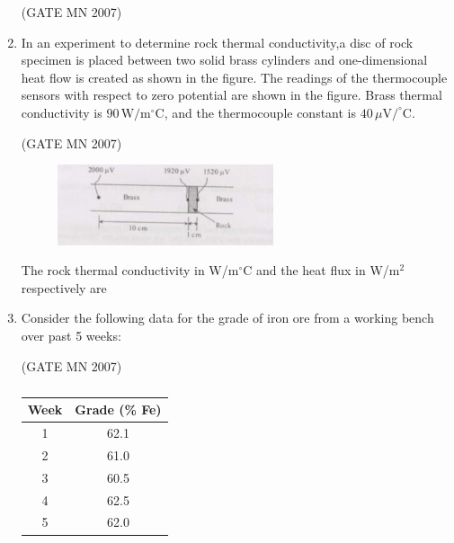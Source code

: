 \documentclass[journal]{IEEEtran}
\begin{document}
\begin{enumerate}
\hfill (GATE MN 2007)
\begin{enumerate}
\end{enumerate}


\item In an experiment to determine rock thermal conductivity,a disc of rock specimen is placed between two solid brass cylinders and one-dimensional heat flow is created as shown in the figure.  
The readings of the thermocouple sensors with respect to zero potential are shown in the figure.  
Brass thermal conductivity is $90\,\text{W/m$^\circ$C}$, and the thermocouple constant is $40\,\mu\text{V}/^\circ$C.  


\hfill (GATE MN 2007)
\begin{figure}[H]
    \centering
    \includegraphics[width=0.6\textwidth]{Screenshot_2025_0812_172517.png}
\caption{}
    \label{fig:Q56}
\end{figure}

The rock thermal conductivity in W/m$^\circ$C and the heat flux in W/m$^2$ respectively are  
\begin{enumerate}
\end{enumerate}


\item Consider the following data for the grade of iron ore from a working bench over past 5 weeks:


	\hfill (GATE MN 2007)
\begin{table}[H]
    \centering\normalsize
\begin{tabular}{|c|c|}
\hline
Week & Grade (\% Fe) \\
\hline
1 & 62.1 \\
\hline
2 & 61.0 \\
\hline
3 & 60.5 \\
\hline
4 & 62.5 \\
\hline
5 & 62.0 \\
\hline
\end{tabular}
   \caption{}
    \label{tab:Q57}
\end{table}


\end{enumerate}
\end{document}
